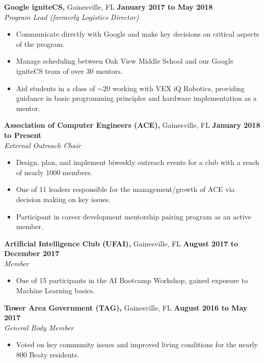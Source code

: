 \documentclass[11pt]{article} %
\begin{document}
		\vspace{.1cm}
		
		\noindent \textbf{Google igniteCS,} Gainesville, FL \hfill\textbf{January 2017 to May 2018}\\
		\textit{Program Lead (formerly Logistics Director)}
		\begin{itemize}[noitemsep,nolistsep, label = {-}]
			\item Communicate directly with Google and make key decisions on critical aspects of the program.
			\item Manage scheduling between Oak View Middle School and our Google igniteCS team of over 30 mentors.
			\item Aid students in a class of $\sim$20 working with VEX iQ Robotics, providing guidance in basic programming principles and hardware implementation as a mentor.
		\end{itemize} 
	
		\vspace{.1cm}
		
		\noindent \textbf{Association of Computer Engineers (ACE),} Gainesville, FL \hfill\textbf{January 2018 to Present}\\
		\textit{External Outreach Chair}
		\begin{itemize}[noitemsep,nolistsep, label={-}]
			\item Design, plan, and implement biweekly outreach events for a club with a reach of nearly 1000 members.
			\item One of 11 leaders responsible for the management/growth of ACE via decision making on key issues.
			\item Participant in career development mentorship pairing program as an active member.
		\end{itemize}
	
		\vspace{.1cm}
		
		\noindent \textbf{Artificial Intelligence Club (UFAI),} Gainesville, FL \hfill\textbf{August 2017 to December 2017}\\
		\textit{Member}
		\begin{itemize}[noitemsep,nolistsep, label={-}]
			\item One of 15 participants in the AI Bootcamp Workshop, gained exposure to Machine Learning basics.
		\end{itemize}
		
		\vspace{.1cm}
		
		\noindent \textbf{Tower Area Government (TAG),} Gainesville, FL \hfill\textbf{August 2016 to May 2017}\\
		\textit{General Body Member}
		\begin{itemize}[noitemsep,nolistsep, label={-}]
			\item Voted on key community issues and improved living conditions for the nearly 800 Beaty residents.
		\end{itemize}
		
\end{document}
